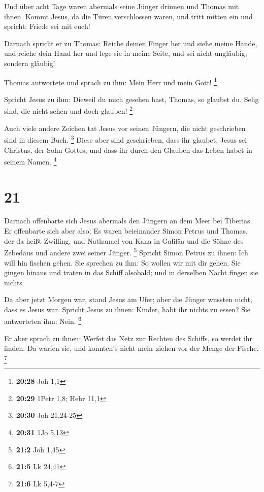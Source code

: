  Und über acht Tage waren abermals seine Jünger drinnen und
Thomas mit ihnen. Kommt Jesus, da die Türen verschlossen waren, und
tritt mitten ein und spricht: Friede sei mit euch!

 Darnach spricht er zu Thomas: Reiche deinen Finger her und
siehe meine Hände, und reiche dein Hand her und lege sie in meine Seite,
und sei nicht ungläubig, sondern gläubig!

 Thomas antwortete und sprach zu ihm: Mein Herr und mein
Gott! \footnote{\textbf{20:28} Joh 1,1}

 Spricht Jesus zu ihm: Dieweil du mich gesehen hast,
Thomas, so glaubst du. Selig sind, die nicht sehen und doch glauben!
\footnote{\textbf{20:29} 1Petr 1,8; Hebr 11,1}

 Auch viele andere Zeichen tat Jesus vor seinen Jüngern,
die nicht geschrieben sind in diesem Buch. \footnote{\textbf{20:30} Joh
  21,24-25}  Diese aber sind geschrieben, dass ihr glaubet,
Jesus sei Christus, der Sohn Gottes, und dass ihr durch den Glauben das
Leben habet in seinem Namen. \footnote{\textbf{20:31} 1Jo 5,13}

\hypertarget{section-8}{%
\section{21}\label{section-8}}

 Darnach offenbarte sich Jesus abermals den Jüngern an dem
Meer bei Tiberias. Er offenbarte sich aber also:  Es waren
beieinander Simon Petrus und Thomas, der da heißt Zwilling, und
Nathanael von Kana in Galiläa und die Söhne des Zebedäus und andere zwei
seiner Jünger. \footnote{\textbf{21:2} Joh 1,45}  Spricht
Simon Petrus zu ihnen: Ich will hin fischen gehen. Sie sprechen zu ihm:
So wollen wir mit dir gehen. Sie gingen hinaus und traten in das Schiff
alsobald; und in derselben Nacht fingen sie nichts.

 Da aber jetzt Morgen war, stand Jesus am Ufer; aber die
Jünger wussten nicht, dass es Jesus war.  Spricht Jesus zu
ihnen: Kinder, habt ihr nichts zu essen? Sie antworteten ihm: Nein.
\footnote{\textbf{21:5} Lk 24,41}

 Er aber sprach zu ihnen: Werfet das Netz zur Rechten des
Schiffs, so werdet ihr finden. Da warfen sie, und konnten's nicht mehr
ziehen vor der Menge der Fische. \footnote{\textbf{21:6} Lk 5,4-7}

